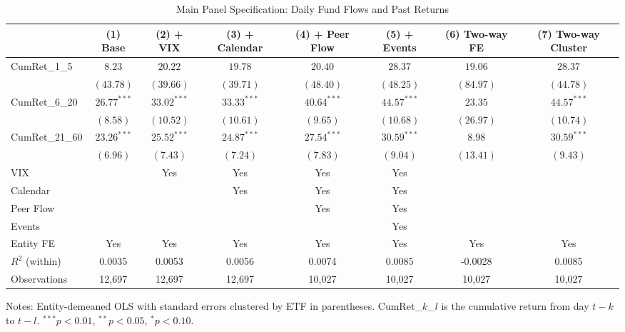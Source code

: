 \begin{table}[htbp]\centering
\caption{Main Panel Specification: Daily Fund Flows and Past Returns}
\label{tab:main_panel}
\begin{tabular}{lccccccc}
\toprule
 & (1) Base & (2) + VIX & (3) + Calendar & (4) + Peer Flow & (5) + Events & (6) Two-way FE & (7) Two-way Cluster \\
\midrule
CumRet\_1\_5 & $8.23$ & $20.22$ & $19.78$ & $20.40$ & $28.37$ & $19.06$ & $28.37$ \\
 & $(43.78)$ & $(39.66)$ & $(39.71)$ & $(48.40)$ & $(48.25)$ & $(84.97)$ & $(44.78)$ \\[3pt]
CumRet\_6\_20 & $26.77^{***}$ & $33.02^{***}$ & $33.33^{***}$ & $40.64^{***}$ & $44.57^{***}$ & $23.35$ & $44.57^{***}$ \\
 & $(8.58)$ & $(10.52)$ & $(10.61)$ & $(9.65)$ & $(10.68)$ & $(26.97)$ & $(10.74)$ \\[3pt]
CumRet\_21\_60 & $23.26^{***}$ & $25.52^{***}$ & $24.87^{***}$ & $27.54^{***}$ & $30.59^{***}$ & $8.98$ & $30.59^{***}$ \\
 & $(6.96)$ & $(7.43)$ & $(7.24)$ & $(7.83)$ & $(9.04)$ & $(13.41)$ & $(9.43)$ \\[3pt]
\midrule
VIX &  & Yes & Yes & Yes & Yes \\
Calendar &  &  & Yes & Yes & Yes \\
Peer Flow &  &  &  & Yes & Yes \\
Events &  &  &  &  & Yes \\
\midrule
Entity FE & Yes & Yes & Yes & Yes & Yes & Yes & Yes \\
$R^2$ (within) & 0.0035 & 0.0053 & 0.0056 & 0.0074 & 0.0085 & -0.0028 & 0.0085 \\
Observations & 12,697 & 12,697 & 12,697 & 10,027 & 10,027 & 10,027 & 10,027 \\
\bottomrule
\end{tabular}
\begin{tablenotes}\small
\item Notes: Entity-demeaned OLS with standard errors clustered by ETF
in parentheses. CumRet\_$k$\_$l$ is the cumulative return from day $t-k$
to $t-l$. $^{***}p<0.01$, $^{**}p<0.05$, $^{*}p<0.10$.
\end{tablenotes}
\end{table}